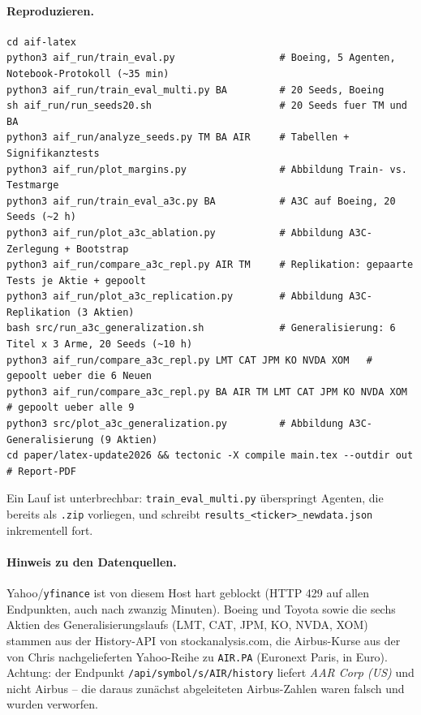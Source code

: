 \paragraph{Reproduzieren.}
{\footnotesize
\begin{verbatim}
cd aif-latex
python3 aif_run/train_eval.py                  # Boeing, 5 Agenten, Notebook-Protokoll (~35 min)
python3 aif_run/train_eval_multi.py BA         # 20 Seeds, Boeing
sh aif_run/run_seeds20.sh                      # 20 Seeds fuer TM und BA
python3 aif_run/analyze_seeds.py TM BA AIR     # Tabellen + Signifikanztests
python3 aif_run/plot_margins.py                # Abbildung Train- vs. Testmarge
python3 aif_run/train_eval_a3c.py BA           # A3C auf Boeing, 20 Seeds (~2 h)
python3 aif_run/plot_a3c_ablation.py           # Abbildung A3C-Zerlegung + Bootstrap
python3 aif_run/compare_a3c_repl.py AIR TM     # Replikation: gepaarte Tests je Aktie + gepoolt
python3 aif_run/plot_a3c_replication.py        # Abbildung A3C-Replikation (3 Aktien)
bash src/run_a3c_generalization.sh             # Generalisierung: 6 Titel x 3 Arme, 20 Seeds (~10 h)
python3 aif_run/compare_a3c_repl.py LMT CAT JPM KO NVDA XOM   # gepoolt ueber die 6 Neuen
python3 aif_run/compare_a3c_repl.py BA AIR TM LMT CAT JPM KO NVDA XOM  # gepoolt ueber alle 9
python3 src/plot_a3c_generalization.py         # Abbildung A3C-Generalisierung (9 Aktien)
cd paper/latex-update2026 && tectonic -X compile main.tex --outdir out   # Report-PDF
\end{verbatim}
}

Ein Lauf ist unterbrechbar: \texttt{train\_eval\_multi.py} überspringt Agenten, die bereits als
\texttt{.zip} vorliegen, und schreibt \texttt{results\_<ticker>\_newdata.json} inkrementell fort.

\paragraph{Hinweis zu den Datenquellen.} Yahoo/\texttt{yfinance} ist von diesem Host hart
geblockt (HTTP 429 auf allen Endpunkten, auch nach zwanzig Minuten). Boeing und Toyota
sowie die sechs Aktien des Generalisierungslaufs (LMT, CAT, JPM, KO, NVDA, XOM) stammen
aus der History-API von stockanalysis.com, die Airbus-Kurse aus der von Chris nachgelieferten
Yahoo-Reihe zu \texttt{AIR.PA} (Euronext Paris, in Euro). Achtung: der Endpunkt
\texttt{/api/symbol/s/AIR/history} liefert \emph{AAR Corp (US)} und nicht Airbus -- die
daraus zunächst abgeleiteten Airbus-Zahlen waren falsch und wurden verworfen.

